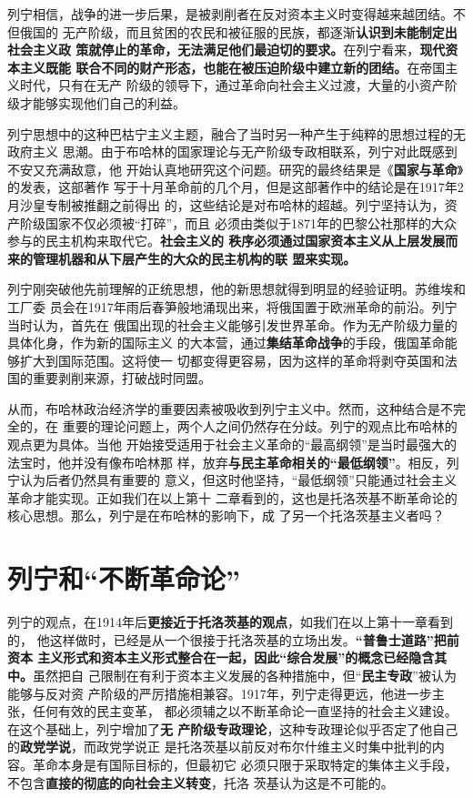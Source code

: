 列宁相信，战争的进一步后果，是被剥削者在反对资本主义时变得越来越团结。不但俄国的
无产阶级，而且贫困的农民和被征服的民族，都逐渐\textbf{认识到未能制定出社会主义政
  策就停止的革命，无法满足他们最迫切的要求。}在列宁看来，\textbf{现代资本主义既能
  联合不同的财产形态，也能在被压迫阶级中建立新的团结。}在帝国主义时代，只有在无产
阶级的领导下，通过革命向社会主义过渡，大量的小资产阶级才能够实现他们自己的利益。

列宁思想中的这种巴枯宁主义主题，融合了当时另一种产生于纯粹的思想过程的无政府主义
思潮。由于布哈林的国家理论与无产阶级专政相联系，列宁对此既感到不安又充满敌意，他
开始认真地研究这个问题。研究的最终结果是《\textbf{国家与革命}》的发表，这部著作
写于十月革命前的几个月，但是这部著作中的结论是在1917年2月沙皇专制被推翻之前得出
的，这些结论是对布哈林的超越。列宁坚持认为，资产阶级国家不仅必须被“打碎”，而且
必须由类似于1871年的巴黎公社那样的大众参与的民主机构来取代它。\textbf{社会主义的
秩序必须通过国家资本主义从上层发展而来的管理机器和从下层产生的大众的民主机构的联
盟来实现。}

列宁刚突破他先前理解的正统思想，他的新思想就得到明显的经验证明。苏维埃和工厂委
员会在1917年雨后春笋般地涌现出来，将俄国置于欧洲革命的前沿。列宁当时认为，首先在
俄国出现的社会主义能够引发世界革命。作为无产阶级力量的具体化身，作为新的国际主义
的大本营，通过\textbf{集结革命战争}的手段，俄国革命能够扩大到国际范围。这将使一
切都变得更容易，因为这样的革命将剥夺英国和法国的重要剥削来源，打破战时同盟。

从而，布哈林政治经济学的重要因素被吸收到列宁主义中。然而，这种结合是不完全的，在
重要的理论问题上，两个人之间仍然存在分歧。列宁的观点比布哈林的观点更为具体。当他
开始接受适用于社会主义革命的“最高纲领”是当时最强大的法宝时，他并没有像布哈林那
样，放弃\textbf{与民主革命相关的“最低纲领”}。相反，列宁认为后者仍然具有重要的
意义，但这时他坚持，“最低纲领”只能通过社会主义革命才能实现。正如我们在以上第十
二章看到的，这也是托洛茨基不断革命论的核心思想。那么，列宁是在布哈林的影响下，成
了另一个托洛茨基主义者吗？

\vfill

\section{列宁和“不断革命论”}

列宁的观点，在1914年后\textbf{更接近于托洛茨基的观点}，如我们在以上第十一章看到的，
他这样做时，已经是从一个很接于托洛茨基的立场出发。\textbf{“普鲁士道路”把前资本
  主义形式和资本主义形式整合在一起，因此“综合发展”的概念已经隐含其中。}虽然把自
己限制在有利于资本主义发展的各种措施中，但“\textbf{民主专政}”被认为能够与反对资
产阶级的严厉措施相兼容。1917年，列宁走得更远，他进一步主张，任何有效的民主变革，
都必须辅之以不断革命论一直坚持的社会主义建设。在这个基础上，列宁增加了\textbf{无
  产阶级专政理论}，这种专政理论似乎否定了他自己的\textbf{政党学说}，而政党学说正
是托洛茨基以前反对布尔什维主义时集中批判的内容。革命本身是有国际目标的，但最初它
必须只限于采取特定的集体主义手段，不包含\textbf{直接的彻底的向社会主义转变}，托洛
茨基认为这是不可能的。

